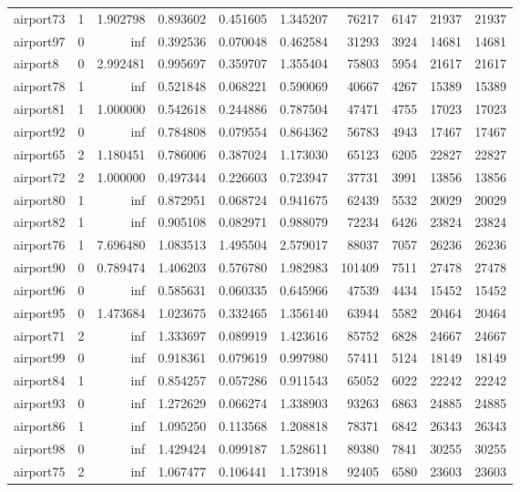 \begin{longtable}{|l|r|r|r|r|r|r|r|r|r|}
airport73 & 1 & 1.902798 & 0.893602 & 0.451605 & 1.345207 & 76217 & 6147 & 21937 & 21937 \\
airport97 & 0 & inf & 0.392536 & 0.070048 & 0.462584 & 31293 & 3924 & 14681 & 14681 \\
airport8 & 0 & 2.992481 & 0.995697 & 0.359707 & 1.355404 & 75803 & 5954 & 21617 & 21617 \\
airport78 & 1 & inf & 0.521848 & 0.068221 & 0.590069 & 40667 & 4267 & 15389 & 15389 \\
airport81 & 1 & 1.000000 & 0.542618 & 0.244886 & 0.787504 & 47471 & 4755 & 17023 & 17023 \\
airport92 & 0 & inf & 0.784808 & 0.079554 & 0.864362 & 56783 & 4943 & 17467 & 17467 \\
airport65 & 2 & 1.180451 & 0.786006 & 0.387024 & 1.173030 & 65123 & 6205 & 22827 & 22827 \\
airport72 & 2 & 1.000000 & 0.497344 & 0.226603 & 0.723947 & 37731 & 3991 & 13856 & 13856 \\
airport80 & 1 & inf & 0.872951 & 0.068724 & 0.941675 & 62439 & 5532 & 20029 & 20029 \\
airport82 & 1 & inf & 0.905108 & 0.082971 & 0.988079 & 72234 & 6426 & 23824 & 23824 \\
airport76 & 1 & 7.696480 & 1.083513 & 1.495504 & 2.579017 & 88037 & 7057 & 26236 & 26236 \\
airport90 & 0 & 0.789474 & 1.406203 & 0.576780 & 1.982983 & 101409 & 7511 & 27478 & 27478 \\
airport96 & 0 & inf & 0.585631 & 0.060335 & 0.645966 & 47539 & 4434 & 15452 & 15452 \\
airport95 & 0 & 1.473684 & 1.023675 & 0.332465 & 1.356140 & 63944 & 5582 & 20464 & 20464 \\
airport71 & 2 & inf & 1.333697 & 0.089919 & 1.423616 & 85752 & 6828 & 24667 & 24667 \\
airport99 & 0 & inf & 0.918361 & 0.079619 & 0.997980 & 57411 & 5124 & 18149 & 18149 \\
airport84 & 1 & inf & 0.854257 & 0.057286 & 0.911543 & 65052 & 6022 & 22242 & 22242 \\
airport93 & 0 & inf & 1.272629 & 0.066274 & 1.338903 & 93263 & 6863 & 24885 & 24885 \\
airport86 & 1 & inf & 1.095250 & 0.113568 & 1.208818 & 78371 & 6842 & 26343 & 26343 \\
airport98 & 0 & inf & 1.429424 & 0.099187 & 1.528611 & 89380 & 7841 & 30255 & 30255 \\
airport75 & 2 & inf & 1.067477 & 0.106441 & 1.173918 & 92405 & 6580 & 23603 & 23603 \\

\end{longtable}
